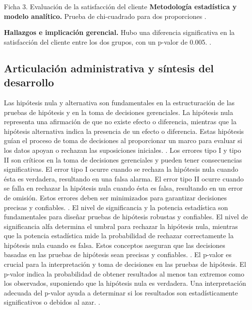 {\begin{fichainvestigacion}{Ficha 3. Evaluación de la satisfacción del cliente}
\textbf{Metodología estadística y modelo analítico.} Prueba de chi-cuadrado para dos proporciones \citep{wackerly2010,lind2012}.

\textbf{Hallazgos e implicación gerencial.} Hubo una diferencia significativa en la satisfacción del cliente entre los dos grupos, con un p-valor de 0.005. \citep{nistHandbook}.
\end{fichainvestigacion}


\subsection{Articulación administrativa y síntesis del desarrollo}
Las hipótesis nula y alternativa son fundamentales en la estructuración de las pruebas de hipótesis y en la toma de decisiones gerenciales. La hipótesis nula representa una afirmación de que no existe efecto o diferencia, mientras que la hipótesis alternativa indica la presencia de un efecto o diferencia. Estas hipótesis guían el proceso de toma de decisiones al proporcionar un marco para evaluar si los datos apoyan o rechazan las suposiciones iniciales. \citep{holmesBusiness2023,nistHandbook}.
Los errores tipo I y tipo II son críticos en la toma de decisiones gerenciales y pueden tener consecuencias significativas. El error tipo I ocurre cuando se rechaza la hipótesis nula cuando ésta es verdadera, resultando en una falsa alarma. El error tipo II ocurre cuando se falla en rechazar la hipótesis nula cuando ésta es falsa, resultando en un error de omisión. Estos errores deben ser minimizados para garantizar decisiones precisas y confiables. \citep{holmesBusiness2023,nistHandbook}.
El nivel de significancia y la potencia estadística son fundamentales para diseñar pruebas de hipótesis robustas y confiables. El nivel de significancia alfa determina el umbral para rechazar la hipótesis nula, mientras que la potencia estadística mide la probabilidad de rechazar correctamente la hipótesis nula cuando es falsa. Estos conceptos aseguran que las decisiones basadas en las pruebas de hipótesis sean precisas y confiables. \citep{holmesBusiness2023,nistHandbook}.
El p-valor es crucial para la interpretación y toma de decisiones en las pruebas de hipótesis. El p-valor indica la probabilidad de obtener resultados al menos tan extremos como los observados, suponiendo que la hipótesis nula es verdadera. Una interpretación adecuada del p-valor ayuda a determinar si los resultados son estadísticamente significativos o debidos al azar. \citep{holmesBusiness2023,nistHandbook}.

}
